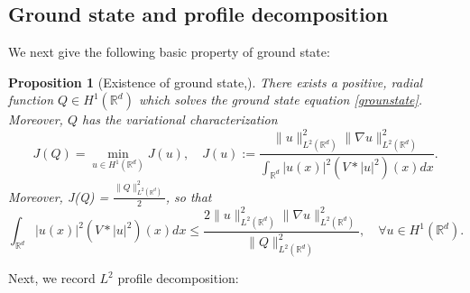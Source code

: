 \documentclass[reqno,11pt]{amsart}
\theoremstyle{plain}
\newtheorem{proposition}[theorem]{Proposition}
\theoremstyle{definition}
\numberwithin{equation}{section}
\numberwithin{theorem}{section}
\def\leq{\leqslant}
\def\R{\mathbb{R}}
\begin{document}
\subsection{Ground state and profile decomposition}
We next give the following basic property of ground state:
\begin{proposition}[Existence of ground state,\cite{MiaoXuZhaoblowup}]
     There exists a positive, radial function $Q \in H^1(\R^d)$  which solves the ground state equation \eqref{grounstate}. Moreover, $Q$ has the variational characterization
\[
J(Q) = \min_{u \in H^1(\R^d)} J(u), \quad J(u) := \frac{\|u\|_{L^2(\R^d)}^2 \|\nabla u\|_{L^2(\R^d)}^2}{\int_{\R^d} |u(x)|^2 (V * |u|^2)(x) dx}.
\]
Moreover, J(Q) = $\frac{\|Q\|_{L^2(\R^d)}^2}{2}$, so that
\[
\int_{\R^d} |u(x)|^2 (V * |u|^2)(x) dx \leq \frac{2 \|u\|_{L^2(\R^d)}^2 \|\nabla u\|_{L^2(\R^d)}^2}{\|Q\|_{L^2(\R^d)}^2}, \quad \forall u \in H^1(\R^d).
\]
\end{proposition}
Next, we record $L^2$ profile decomposition:
\end{document}
